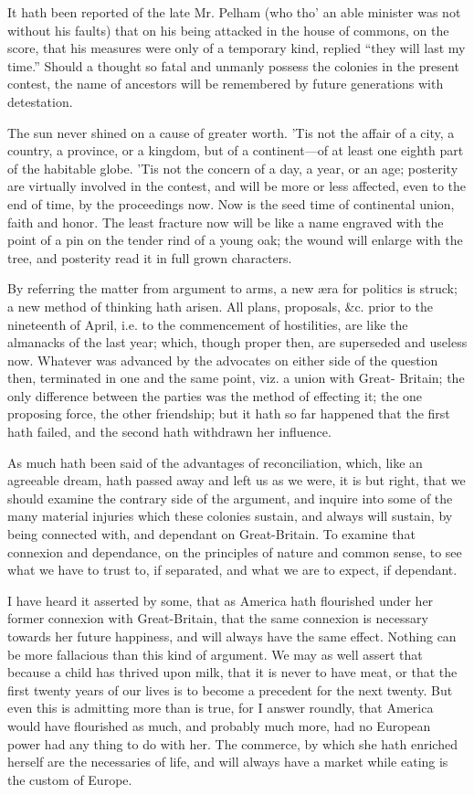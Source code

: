 \documentclass[12pt,oneside]{memoir}
\begin{document}
It hath been reported of the late Mr. Pelham (who tho' an able
minister was not without his faults) that on his being attacked in
the house of commons, on the score, that his measures were only of a
temporary kind, replied ``they will last my time.'' Should a thought
so fatal and unmanly possess the colonies in the present contest,
the name of ancestors will be remembered by future generations with
detestation.

The sun never shined on a cause of greater worth. 'Tis not the
affair of a city, a country, a province, or a kingdom, but of a
continent---of at least one eighth part of the habitable globe. 'Tis
not the concern of a day, a year, or an age; posterity are virtually
involved in the contest, and will be more or less affected, even to
the end of time, by the proceedings now. Now is the seed time of
continental union, faith and honor. The least fracture now will be
like a name engraved with the point of a pin on the tender rind of a
young oak; the wound will enlarge with the tree, and posterity read
it in full grown characters.

By referring the matter from argument to arms, a new æra for
politics is struck; a new method of thinking hath arisen. All plans,
proposals, \&c. prior to the nineteenth of April, i.e. to the
commencement of hostilities, are like the almanacks of the last year;
which, though proper then, are superseded and useless now. Whatever
was advanced by the advocates on either side of the question then,
terminated in one and the same point, viz. a union with Great-
Britain; the only difference between the parties was the method of
effecting it; the one proposing force, the other friendship; but it
hath so far happened that the first hath failed, and the second hath
withdrawn her influence.

As much hath been said of the advantages of reconciliation, which,
like an agreeable dream, hath passed away and left us as we were, it
is but right, that we should examine the contrary side of the
argument, and inquire into some of the many material injuries which
these colonies sustain, and always will sustain, by being connected
with, and dependant on Great-Britain. To examine that connexion and
dependance, on the principles of nature and common sense, to see
what we have to trust to, if separated, and what we are to expect,
if dependant.

I have heard it asserted by some, that as America hath flourished
under her former connexion with Great-Britain, that the same
connexion is necessary towards her future happiness, and will always
have the same effect. Nothing can be more fallacious than this kind
of argument. We may as well assert that because a child has thrived
upon milk, that it is never to have meat, or that the first twenty
years of our lives is to become a precedent for the next twenty. But
even this is admitting more than is true, for I answer roundly, that
America would have flourished as much, and probably much more, had
no European power had any thing to do with her. The commerce, by
which she hath enriched herself are the necessaries of life, and
will always have a market while eating is the custom of Europe.
\end{document}
